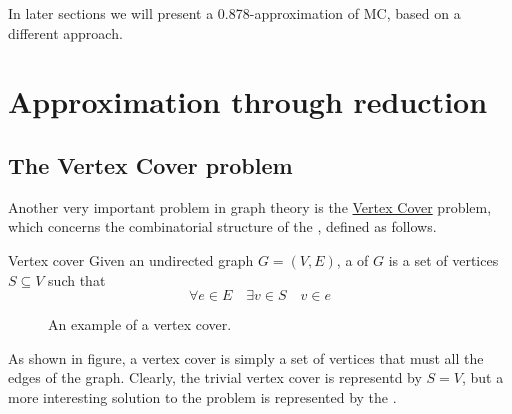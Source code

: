 \documentclass[a4paper, 12pt]{report}
\begin{document}
    In later sections we will present a 0.878-approximation of MC, based on a  different approach.

    \section{Approximation through reduction}

    \subsection{The Vertex Cover problem}

    Another very important problem in graph theory is the \href{https://en.wikipedia.org/wiki/Vertex_cover}{Vertex Cover} problem, which concerns the combinatorial structure of the , defined as follows.

    \begin{frameddefn}{Vertex cover}
        Given an undirected graph $G = (V, E)$, a  of $G$ is a set of vertices $S \subseteq V$ such that $$\forall e \in E \quad \exists v \in S \quad v \in e$$
    \end{frameddefn}

    \begin{figure}[H]
        \centering
        \caption{An example of a vertex cover.}
    \end{figure}

    As shown in figure, a vertex cover is simply a set of vertices that must  all the edges of the graph. Clearly, the trivial vertex cover is representd by $S = V$, but a more interesting solution to the problem is represented by the .
\end{document}
